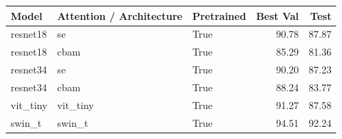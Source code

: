 \begin{tabular}{lllrr}
\toprule
Model & Attention / Architecture & Pretrained & Best Val & Test \\
\midrule
resnet18 & se & True & 90.78 & 87.87 \\
resnet18 & cbam & True & 85.29 & 81.36 \\
resnet34 & se & True & 90.20 & 87.23 \\
resnet34 & cbam & True & 88.24 & 83.77 \\
vit\_tiny & vit\_tiny & True & 91.27 & 87.58 \\
swin\_t & swin\_t & True & 94.51 & 92.24 \\
\bottomrule
\end{tabular}
